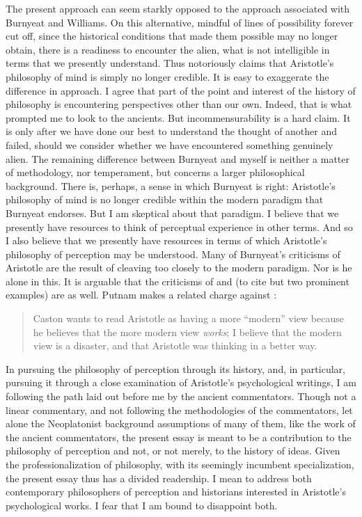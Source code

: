 The present approach can seem starkly opposed to the approach associated with Burnyeat and Williams. On this alternative, mindful of lines of possibility forever cut off, since the historical conditions that made them possible may no longer obtain, there is a readiness to encounter the alien, what is not intelligible in terms that we presently understand. Thus \citet{Burnyeat:1992fk} notoriously claims that Aristotle's philosophy of mind is simply no longer credible. It is easy to exaggerate the difference in approach. I agree that part of the point and interest of the history of philosophy is encountering perspectives other than our own. Indeed, that is what prompted me to look to the ancients. But incommensurability is a hard claim. It is only after we have done our best to understand the thought of another and failed, should we consider whether we have encountered something genuinely alien. The remaining difference between Burnyeat and myself is neither a matter of methodology, nor temperament, but concerns a larger philosophical background. There is, perhaps, a sense in which Burnyeat is right: Aristotle's philosophy of mind is no longer credible within the modern paradigm that Burnyeat endorses. But I am skeptical about that paradigm. I believe that we presently have resources to think of perceptual experience in other terms. And so I also believe that we presently have resources in terms of which Aristotle's philosophy of perception may be understood. Many of Burnyeat's criticisms of Aristotle are the result of cleaving too closely to the modern paradigm. Nor is he alone in this. It is arguable that the criticisms of \citet{Broadie:1993fk} and \citet{Sorabji:1971fr} (to cite but two prominent examples) are as well. Putnam makes a related charge against \citet{Caston:1998nx}:
\begin{quote}
	Caston wants to read Aristotle as having a more ``modern'' view because he believes that the more modern view \emph{works}; I believe that the modern view is a disaster, and that Aristotle was thinking in a better way. \citep[588--589]{Putnam:2012eu}
\end{quote}

In pursuing the philosophy of perception through its history, and, in particular, pursuing it through a close examination of Aristotle's psychological writings, I am following the path laid out before me by the ancient commentators. Though not a linear commentary, and not following the methodologies of the commentators, let alone the Neoplatonist background assumptions of many of them, like the work of the ancient commentators, the present essay is meant to be a contribution to the philosophy of perception and not, or not merely, to the history of ideas. Given the professionalization of philosophy, with its seemingly incumbent specialization, the present essay thus has a divided readership. I mean to address both contemporary philosophers of perception and historians interested in Aristotle's psychological works. I fear that I am bound to disappoint both. 

